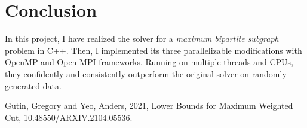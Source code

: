 \documentclass[epsf,epic,eepic,eepicemu]{article}
\begin{document}
\section{Conclusion}

In this project, I have realized the solver for a \textit{maximum bipartite subgraph} problem in C++. Then, I implemented its three parallelizable modifications with OpenMP and Open MPI frameworks. Running on multiple threads and CPUs, they confidently and consistently outperform the original solver on randomly generated data. 

\begin{thebibliography}{10}
 Gutin, Gregory and Yeo, Anders, 2021, Lower Bounds for Maximum Weighted Cut, 10.48550/ARXIV.2104.05536.
\end{thebibliography}
\end{document}
